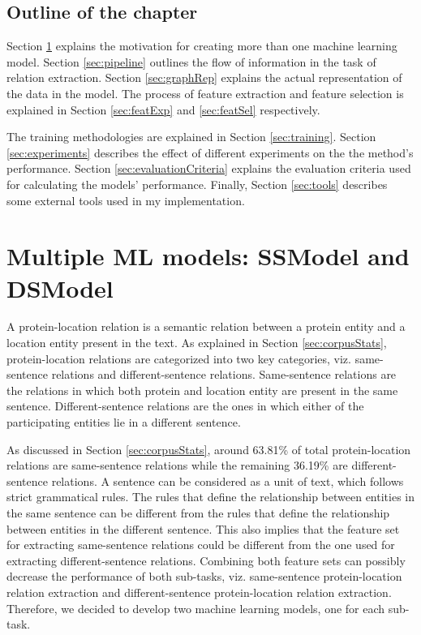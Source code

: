 \subsection*{Outline of the chapter}

Section \ref{sec:ssModeldsModel} explains the motivation for creating more than one machine learning model. Section \ref{sec:pipeline} outlines the flow of information in the task of relation extraction. Section \ref{sec:graphRep} explains the actual representation of the data in the model. The process of feature extraction and feature selection is explained in Section \ref{sec:featExp} and \ref{sec:featSel} respectively.

The training methodologies are explained in Section \ref{sec:training}. Section \ref{sec:experiments} describes the effect of different experiments on the the method's performance. Section \ref{sec:evaluationCriteria} explains the evaluation criteria used for calculating the models' performance. Finally, Section \ref{sec:tools} describes some external tools used in my implementation.

\section{Multiple ML models: SSModel and DSModel}\label{sec:ssModeldsModel}

A protein-location relation is a semantic relation between a protein entity and a location entity present in the text. As explained in Section \ref{sec:corpusStats}, protein-location relations are categorized into two key categories, viz. same-sentence relations and different-sentence relations. Same-sentence relations are the relations in which both protein and location entity are present in the same sentence. Different-sentence relations are the ones in which either of the participating entities lie in a different sentence.

As discussed in Section \ref{sec:corpusStats}, around 63.81\% of total protein-location relations are same-sentence relations while the remaining 36.19\% are different-sentence relations. A sentence can be considered as a unit of text, which follows strict grammatical rules. The rules that define the relationship between entities in the same sentence can be different from the rules that define the relationship between entities in the different sentence. This also implies that the feature set for extracting same-sentence relations could be different from the one used for extracting different-sentence relations. Combining both feature sets can possibly decrease the performance of both sub-tasks, viz. same-sentence protein-location relation extraction and different-sentence protein-location relation extraction. Therefore, we decided to develop two machine learning models, one for each sub-task.

